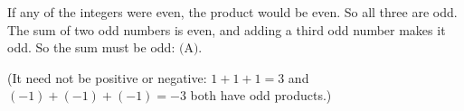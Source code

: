 If any of the integers were even, the product would be even. So all three are odd. The sum of two odd numbers is even, and adding a third odd number makes it odd. So the sum must be odd: $\boxed{\text{(A)}}$.

(It need not be positive or negative: $1+1+1=3$ and $(-1)+(-1)+(-1)=-3$ both have odd products.)
